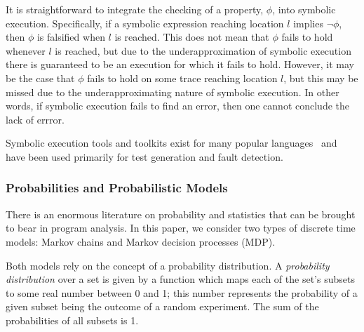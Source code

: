 It is straightforward to integrate the checking of a property,
$\phi$, into symbolic execution.  Specifically,
if a symbolic expression reaching location $l$ implies
 $\neg\phi$, then $\phi$ is falsified 
when $l$ is reached.    This does not mean that $\phi$
fails to hold whenever $l$ is reached, but due to the underapproximation
of symbolic execution there is guaranteed to be an execution for which
it fails to hold.
However, it may be the case that $\phi$ fails to hold
on some trace reaching location $l$, but this may be missed
due to the underapproximating nature of symbolic execution.
In other words, if symbolic execution fails to find an error,
then one cannot conclude the lack of errror.

Symbolic execution tools and toolkits exist for many popular 
languages~\cite{pasareanu2010symbolic,godefroid2005dart,jamrozik2013generating,cadar2008klee}
and have been used primarily for test generation and fault detection.

\subsubsection{Probabilities and Probabilistic Models}

There is an enormous literature on probability and statistics
that can be brought to bear in program analysis.  
In this paper, we consider two types of discrete time models:
Markov chains and Markov decision processes (MDP).

Both models rely on the concept of a probability distribution.
A \textit{probability distribution} over a set is given by a function
which maps each of the set's subsets to some real number between 0 and 1;
this number represents the probability of a given subset being the outcome
of a random experiment.
The sum of the probabilities of all subsets is 1.


